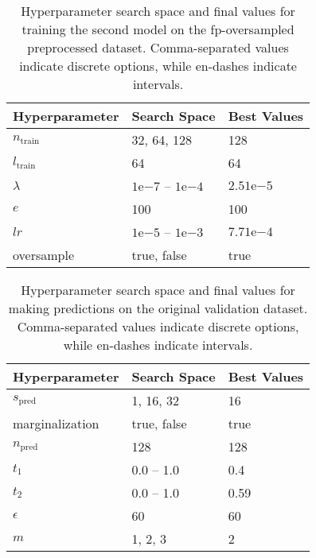 \begin{table}%
  \centering
  \begin{tabular}{l | l | l}
    Hyperparameter    & Search Space                            & Best Values \\
    \hline
    $n_\text{train}$  & 32, 64, 128                             & 128 \\
    $l_\text{train}$  & 64                                      & 64 \\
    $\lambda$         & $1\mathrm{e}{-7}$ -- $1\mathrm{e}{-4}$  & $2.51\mathrm{e}{-5}$ \\
    $e$               & 100                                     & 100 \\
    $lr$              & $1\mathrm{e}{-5}$ -- $1\mathrm{e}{-3}$  & $7.71\mathrm{e}{-4}$ \\
    oversample        & true, false                             & true
  \end{tabular}
  \caption{Hyperparameter search space and final values for training the second model on the \gls{fp}-oversampled preprocessed dataset.  Comma-separated values indicate discrete options, while en-dashes indicate intervals.}
  \label{tab:hyp_fp}
\end{table}

\begin{table}%
  \centering
  \begin{tabular}{l | l | l}
    Hyperparameter    & Search Space & Best Values \\
    \hline
    $s_\text{pred}$   & 1, 16, 32    & 16 \\
    marginalization   & true, false  & true \\
    $n_\text{pred}$   & 128          & 128 \\
    $t_1$             & 0.0 -- 1.0   & 0.4 \\
    $t_2$             & 0.0 -- 1.0   & 0.59 \\
    $\epsilon$        & 60           & 60 \\
    $m$               & 1, 2, 3      & 2 \\
  \end{tabular}
  \caption{Hyperparameter search space and final values for making predictions on the original validation dataset. Comma-separated values indicate discrete options, while en-dashes indicate intervals.}
  \label{tab:hyp_pred}
\end{table}



